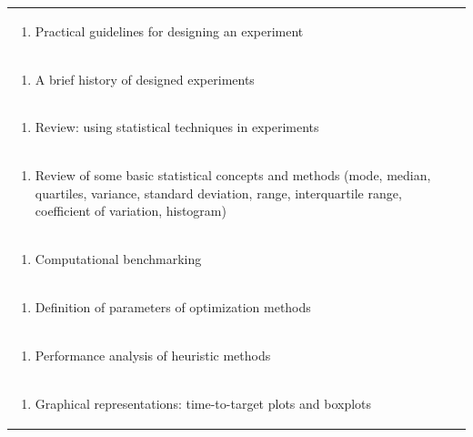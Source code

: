 \documentclass[11pt]{article}
\begin{document}
\begin{center}
\begin{longtable}{|p{4cm}|p{4cm}|p{4cm}|p{4cm}|}
\multicolumn{4}{|p{\dimexpr 16cm + 6\tabcolsep\relax}|}{\begin{enumerate}[start=2]\item Practical guidelines for designing an experiment\end{enumerate}}\\
\multicolumn{4}{|p{\dimexpr 16cm + 6\tabcolsep\relax}|}{\begin{enumerate}[start=3]\item A brief history of designed experiments\end{enumerate}}\\
\multicolumn{4}{|p{\dimexpr 16cm + 6\tabcolsep\relax}|}{\begin{enumerate}[start=4]\item Review: using statistical techniques in experiments\end{enumerate}}\\
\multicolumn{4}{|p{\dimexpr 16cm + 6\tabcolsep\relax}|}{\begin{enumerate}[start=5]\item Review of some basic statistical concepts and methods (mode, median, quartiles, variance, standard deviation, range, interquartile range, coefficient of variation, histogram)\end{enumerate}}\\
\multicolumn{4}{|p{\dimexpr 16cm + 6\tabcolsep\relax}|}{\begin{enumerate}[start=6]\item Computational benchmarking\end{enumerate}}\\
\multicolumn{4}{|p{\dimexpr 16cm + 6\tabcolsep\relax}|}{\begin{enumerate}[start=7]\item Definition of parameters of optimization methods\end{enumerate}}\\
\multicolumn{4}{|p{\dimexpr 16cm + 6\tabcolsep\relax}|}{\begin{enumerate}[start=8]\item Performance analysis of heuristic methods\end{enumerate}}\\
\multicolumn{4}{|p{\dimexpr 16cm + 6\tabcolsep\relax}|}{\begin{enumerate}[start=9]\item Graphical representations: time-to-target plots and boxplots\end{enumerate}}\\

\end{longtable}
\end{center}
\end{document}
